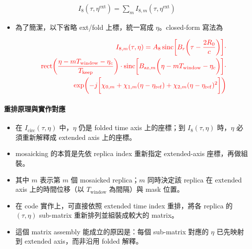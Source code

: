 \documentclass[10pt]{article}
\providecommand{\tightlist}{%
  \setlength{\itemsep}{0pt}\setlength{\parskip}{0pt}}
\begin{document}
\begin{equation}
\begin{aligned}
I_8(\tau,\eta^{\mathrm{ext}})=\sum_m I_{8,m}(\tau,\eta^{\mathrm{ext}})
\end{aligned}
\end{equation}

\begin{itemize}
\tightlist
\item
  為了簡潔，以下省略 ext/fold 上標，統一寫成 \(\eta\)。closed-form
  寫法為
\end{itemize}

\begin{equation}
\begin{aligned}
{\color{red}{I_{8,m}(\tau,\eta)=A_8\,
\mathrm{sinc}\biggl[ B_r\biggl( \tau-\frac{2R_0}{c} \biggr) \biggr]\cdot}}\\
{\color{red}{\qquad \mathrm{rect}\biggl( \frac{\eta-mT_{\mathrm{window}}-\eta_c}{T_{\mathrm{keep}}} \biggr)\cdot
\mathrm{sinc}\biggl[ B_{\mathrm{az},m}\biggl( \eta-mT_{\mathrm{window}}-\eta_c \biggr) \biggr]\cdot}}\\
{\color{red}{\qquad \exp\biggl( -j\biggl[ \chi_{0,m}+\chi_{1,m}(\eta-\eta_{\mathrm{ref}})
+\chi_{2,m}(\eta-\eta_{\mathrm{ref}})^2 \biggr] \biggr)}}
\end{aligned}
\end{equation}

\hypertarget{ux91cdux6392ux539fux7406ux8207ux5be6ux4f5cux5c0dux61c9-1}{%
\paragraph{重排原理與實作對應}\label{ux91cdux6392ux539fux7406ux8207ux5be6ux4f5cux5c0dux61c9-1}}

\begin{itemize}
\tightlist
\item
  在 \(I_{\mathrm{circ}}(\tau,\eta)\) 中，\(\eta\) 仍是 folded time axis
  上的座標；到 \(I_8(\tau,\eta)\) 時，\(\eta\) 必須重新解釋成 extended
  axis 上的座標。
\item
  mosaicking 的本質是先依 replica index 重新指定 extended-axis
  座標，再做組裝。
\item
  其中 \(m\) 表示第 \(m\) 個 mosaicked replica；\(m\) 同時決定該 replica
  在 extended axis 上的時間位移（以 \(T_{\mathrm{window}}\) 為間隔）與
  mask 位置。
\item
  在 code 實作上，可直接依照 extended time index 重排，將各 replica 的
  \((\tau,\eta)\) sub-matrix 重新排列並組裝成較大的 matrix。
\item
  這個 matrix assembly 能成立的原因是：每個 sub-matrix 對應的 \(\eta\)
  已先映射到 extended axis，而非沿用 folded 解釋。
\end{itemize}
\end{document}
